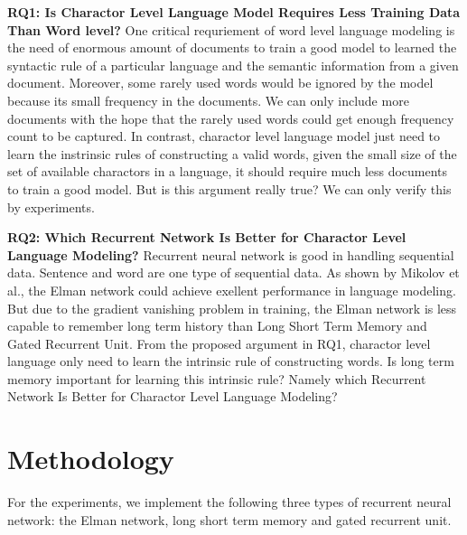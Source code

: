 \documentclass[]{article}
\begin{document}
\textbf{RQ1: Is Charactor Level Language Model Requires Less Training Data Than Word level?} 
One critical requriement of word level language modeling is the need of enormous amount of documents to train a good model to learned the syntactic rule of a particular language and the semantic information from a given document.
Moreover, some rarely used words would be ignored by the model because its small frequency in the documents.
We can only include more documents with the hope that the rarely used words could get enough frequency count to be captured.
In contrast, charactor level language model just need to learn the instrinsic rules of constructing a valid words, given the small size of the set of available charactors in a language, it should require much less documents to train a good model. 
But is this argument really true?
We can only verify this by experiments. 

\textbf{RQ2: Which Recurrent Network Is Better for Charactor Level Language Modeling?} 
Recurrent neural network is good in handling sequential data. 
Sentence and word are one type of sequential data. 
As shown by Mikolov et al.\cite{mikolov2010recurrent}, the Elman network could achieve exellent performance in language modeling.
But due to the gradient vanishing problem in training\cite{hochreiter1998vanishing}, the Elman network is less capable to remember long term history than Long Short Term Memory and Gated Recurrent Unit.
From the proposed argument in RQ1, charactor level language only need to learn the intrinsic rule of constructing words.
Is long term memory important for learning this intrinsic rule? 
Namely which Recurrent Network Is Better for Charactor Level Language Modeling?


\section{Methodology}
For the experiments, we implement the following three types of recurrent neural network: the Elman network, long short term memory and gated recurrent unit.
\end{document}
